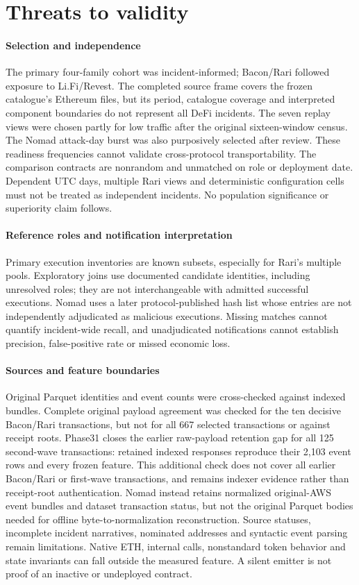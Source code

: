 \documentclass[preprint,12pt,authoryear]{elsarticle}
\begin{document}
\section{Threats to validity}\label{sec:validity}
\paragraph{Selection and independence} The primary four-family cohort was incident-informed; Bacon/Rari followed exposure to Li.Fi/Revest. The completed source frame covers the frozen catalogue's Ethereum files, but its period, catalogue coverage and interpreted component boundaries do not represent all DeFi incidents. The seven replay views were chosen partly for low traffic after the original sixteen-window census. The Nomad attack-day burst was also purposively selected after review. These readiness frequencies cannot validate cross-protocol transportability. The comparison contracts are nonrandom and unmatched on role or deployment date. Dependent UTC days, multiple Rari views and deterministic configuration cells must not be treated as independent incidents. No population significance or superiority claim follows.

\paragraph{Reference roles and notification interpretation} Primary execution inventories are known subsets, especially for Rari's multiple pools. Exploratory joins use documented candidate identities, including unresolved roles; they are not interchangeable with admitted successful executions. Nomad uses a later protocol-published hash list whose entries are not independently adjudicated as malicious executions. Missing matches cannot quantify incident-wide recall, and unadjudicated notifications cannot establish precision, false-positive rate or missed economic loss.

\paragraph{Sources and feature boundaries} Original Parquet identities and event counts were cross-checked against indexed bundles. Complete original payload agreement was checked for the ten decisive Bacon/Rari transactions, but not for all 667 selected transactions or against receipt roots. Phase31 closes the earlier raw-payload retention gap for all 125 second-wave transactions: retained indexed responses reproduce their 2,103 event rows and every frozen feature. This additional check does not cover all earlier Bacon/Rari or first-wave transactions, and remains indexer evidence rather than receipt-root authentication. Nomad instead retains normalized original-AWS event bundles and dataset transaction status, but not the original Parquet bodies needed for offline byte-to-normalization reconstruction. Source statuses, incomplete incident narratives, nominated addresses and syntactic event parsing remain limitations. Native ETH, internal calls, nonstandard token behavior and state invariants can fall outside the measured feature. A silent emitter is not proof of an inactive or undeployed contract.
\end{document}
